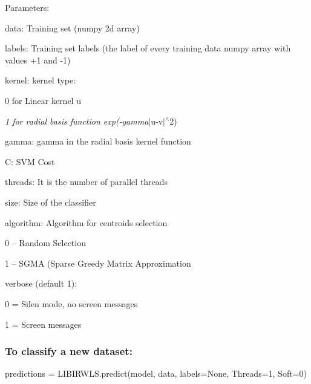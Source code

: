Parameters\+:
\begin{DoxyItemize}
\item data\+: Training set (numpy 2d array)
\item labels\+: Training set labels (the label of every training data numpy array with values +1 and -\/1)
\item kernel\+: kernel type\+:
\begin{DoxyItemize}
\item 0 for Linear kernel u
\item {\itshape 1 for radial basis function exp(-\/gamma}$\vert$u-\/v$\vert$$^\wedge$2)
\end{DoxyItemize}
\item gamma\+: gamma in the radial basis kernel function
\item C\+: S\+VM Cost
\item threads\+: It is the number of parallel threads
\item size\+: Size of the classifier
\item algorithm\+: Algorithm for centroids selection
\begin{DoxyItemize}
\item 0 -- Random Selection
\item 1 -- S\+G\+MA (Sparse Greedy Matrix Approximation
\end{DoxyItemize}
\item verbose (default 1)\+:
\begin{DoxyItemize}
\item 0 = Silen mode, no screen messages
\item 1 = Screen messages
\end{DoxyItemize}
\end{DoxyItemize}

\subsubsection*{To classify a new dataset\+:}

\begin{DoxyVerb}    predictions = LIBIRWLS.predict(model, data, labels=None, Threads=1, Soft=0)
\end{DoxyVerb}


